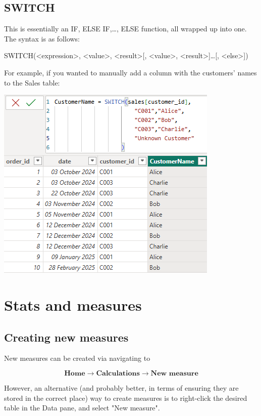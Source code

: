 \documentclass[10pt, openany, twocolumn]{book}
\begin{document}
\subsection*{SWITCH}

This is essentially an IF, ELSE IF,…, ELSE function, all wrapped up into one. The syntax is as follows:
\begin{center}
SWITCH(<expression>, <value>, <result>[, <value>, <result>]…[, <else>])
\end{center}
For example, if you wanted to manually add a column with the customers' names to the Sales table: 
\begin{center}
    \includegraphics[width = 0.95\columnwidth]{images/DAX_SWITCH.png}
\end{center}

\section{Stats and measures}

\subsection*{Creating new measures}

New measures can be created via navigating to

$$\textbf{Home} \rightarrow \textbf{Calculations} \rightarrow \textbf{New measure}$$

However, an alternative (and probably better, in terms of ensuring they are stored in the correct place) way to create measures is to right-click the desired table in the Data pane, and select "New measure".\\ 
\end{document}
